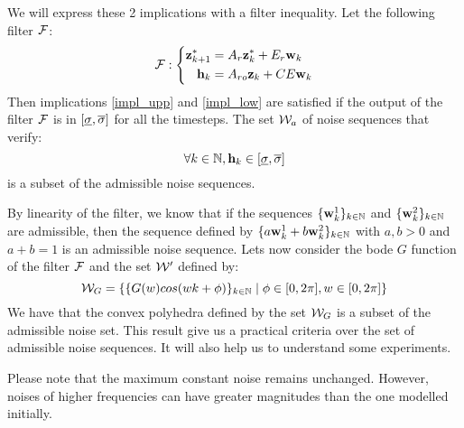 We will express these 2 implications with a filter inequality.
Let the following filter $\mathcal{F}$:
\begin{equation}
\mathcal{F}:
\left\{
\begin{split}
 \mathbf{z}_{k+1}^* &= A_r  \mathbf{z}_k^* + E_r  \mathbf{w}_{k} \\
 \mathbf{h}_{k} &= A_{ro}  \mathbf{z}_k + CE  \mathbf{w}_{k} \\
\end{split}
\right.
\end{equation}
Then implications \ref{impl_upp} and \ref{impl_low} are satisfied if the output of the filter $\mathcal{F}$ is in $[\underline{\sigma},\overline{\sigma}]$ for all the timesteps.
The set $\mathcal{W}_a$ of noise sequences that verify:
\begin{equation}
\forall k \in \mathbb{N},  \mathbf{h}_k \in [\underline{\sigma},\overline{\sigma}]
\end{equation}
is a subset of the admissible noise sequences.


By linearity of the filter, we know that if the sequences $\{ \mathbf{w}_{k}^1\}_{k\in \mathbb{N}}$ and  $\{ \mathbf{w}_{k}^2\}_{k\in \mathbb{N}}$ are admissible, then the sequence defined by $\{a \mathbf{w}_{k}^1 + b \mathbf{w}_{k}^2\}_{k\in \mathbb{N}}$ with $a,b>0$ and $a+b = 1$ is an admissible noise sequence.
Lets now consider the bode $G$ function of the filter $\mathcal{F}$ and the set $\mathcal{W}'$ defined by:
$$\mathcal{W}_G = 
\{ 
\{G(w) cos(w k + \phi)\}_{k \in \mathbb{N}} 
\mid \phi \in [0,2\pi], w \in [0,2\pi] \}
$$
We have that the convex polyhedra defined by the set $\mathcal{W}_G$ is a subset of the admissible noise set.
This result give us a practical criteria over the set of admissible noise sequences.
It will also help us to understand some experiments.

Please note that the maximum constant noise remains unchanged.
However, noises of higher frequencies can have greater magnitudes than the one modelled initially. 


